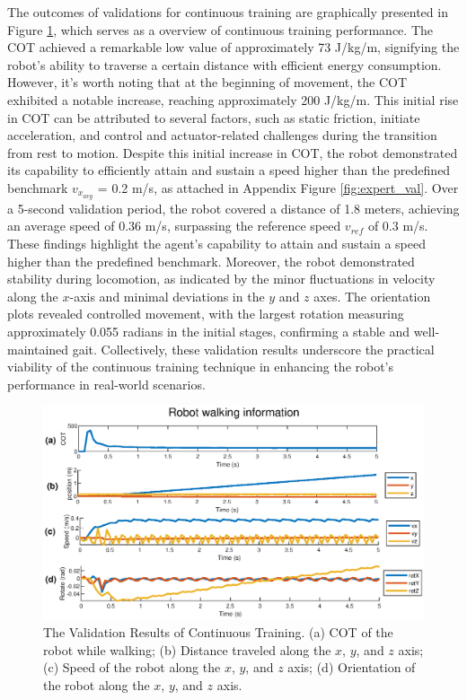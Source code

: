 The outcomes of validations for continuous training are graphically presented in Figure \ref{fig:CT}, which serves as a overview of continuous training performance. The COT achieved a remarkable low value of approximately 73 J/kg/m, signifying the robot's ability to traverse a certain distance with efficient energy consumption. However, it's worth noting that at the beginning of movement, the COT exhibited a notable increase, reaching approximately 200 J/kg/m. This initial rise in COT can be attributed to several factors, such as static friction, initiate acceleration, and control and actuator-related challenges during the transition from rest to motion. Despite this initial increase in COT, the robot demonstrated its capability to efficiently attain and sustain a speed higher than the predefined benchmark $v_{x_{avg}}$ = 0.2 m/s, as attached in Appendix Figure \ref{fig:expert_val}. Over a 5-second validation period, the robot covered a distance of 1.8 meters, achieving an average speed of 0.36 m/s, surpassing the reference speed $v_{ref}$ of 0.3 m/s. These findings highlight the agent's capability to attain and sustain a speed higher than the predefined benchmark. Moreover, the robot demonstrated stability during locomotion, as indicated by the minor fluctuations in velocity along the $x$-axis and minimal deviations in the $y$ and $z$ axes. The orientation plots revealed controlled movement, with the largest rotation measuring approximately 0.055 radians in the initial stages, confirming a stable and well-maintained gait. Collectively, these validation results underscore the practical viability of the continuous training technique in enhancing the robot's performance in real-world scenarios.

\begin{figure}[htb]
    \centering
    \includegraphics[width=0.9\linewidth]{img/chap5/best_CL.eps}
    \caption{The Validation Results of Continuous Training. (a) COT of the robot while walking; (b) Distance traveled along the $x$, $y$, and $z$ axis; (c) Speed of the robot along the $x$, $y$, and $z$ axis; (d) Orientation of the robot along the $x$, $y$, and $z$ axis.}
    \label{fig:CT}
\end{figure}

